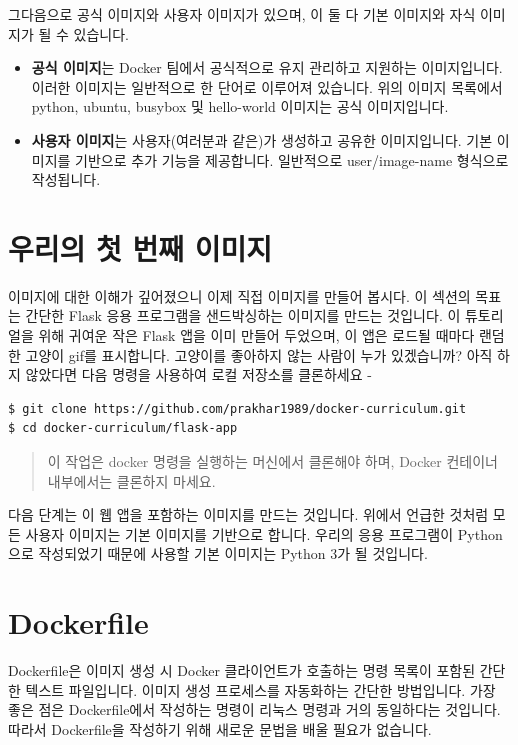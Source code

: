 그다음으로 공식 이미지와 사용자 이미지가 있으며, 이 둘 다 기본 이미지와 자식 이미지가 될 수 있습니다.
\begin{itemize}
    \item \textbf{공식 이미지}는 Docker 팀에서 공식적으로 유지 관리하고 지원하는 이미지입니다. 이러한 이미지는 일반적으로 한 단어로 이루어져 있습니다. 위의 이미지 목록에서 python, ubuntu, busybox 및 hello-world 이미지는 공식 이미지입니다.
    \item \textbf{사용자 이미지}는 사용자(여러분과 같은)가 생성하고 공유한 이미지입니다. 기본 이미지를 기반으로 추가 기능을 제공합니다. 일반적으로 user/image-name 형식으로 작성됩니다.
\end{itemize}

\section{우리의 첫 번째 이미지}
이미지에 대한 이해가 깊어졌으니 이제 직접 이미지를 만들어 봅시다. 이 섹션의 목표는 간단한 Flask 응용 프로그램을 샌드박싱하는 이미지를 만드는 것입니다. 이 튜토리얼을 위해 귀여운 작은 Flask 앱을 이미 만들어 두었으며, 이 앱은 로드될 때마다 랜덤한 고양이 gif를 표시합니다. 고양이를 좋아하지 않는 사람이 누가 있겠습니까? 아직 하지 않았다면 다음 명령을 사용하여 로컬 저장소를 클론하세요 -
\begin{lstlisting}[language=bash]
$ git clone https://github.com/prakhar1989/docker-curriculum.git
$ cd docker-curriculum/flask-app
\end{lstlisting}

\begin{quote}
이 작업은 docker 명령을 실행하는 머신에서 클론해야 하며, Docker 컨테이너 내부에서는 클론하지 마세요.
\end{quote}

다음 단계는 이 웹 앱을 포함하는 이미지를 만드는 것입니다. 위에서 언급한 것처럼 모든 사용자 이미지는 기본 이미지를 기반으로 합니다. 우리의 응용 프로그램이 Python으로 작성되었기 때문에 사용할 기본 이미지는 Python 3가 될 것입니다.

\section{Dockerfile}
Dockerfile은 이미지 생성 시 Docker 클라이언트가 호출하는 명령 목록이 포함된 간단한 텍스트 파일입니다. 이미지 생성 프로세스를 자동화하는 간단한 방법입니다. 가장 좋은 점은 Dockerfile에서 작성하는 명령이 리눅스 명령과 거의 동일하다는 것입니다. 따라서 Dockerfile을 작성하기 위해 새로운 문법을 배울 필요가 없습니다.


